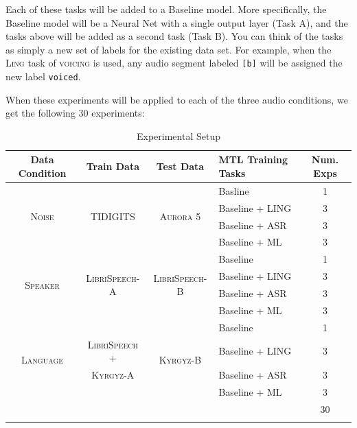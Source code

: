 \documentclass[10pt,a4paper]{article}
\begin{document}
Each of these tasks will be added to a Baseline model. More specifically, the Baseline model will be a Neural Net with a single output layer (Task A), and the tasks above will be added as a second task (Task B). You can think of the tasks as simply a new set of labels for the existing data set. For example, when the \textsc{Ling} task of \textsc{voicing} is used, any audio segment labeled \texttt{[b]} will be assigned the new label \texttt{voiced}.

When these experiments will be applied to each of the three audio conditions, we get the following 30 experiments:

\begin{table}[!htbp]
  \centering
  \begin{adjustbox}{width=.75\textwidth}
    \begin{tabular}{ccclc}
      \toprule
      \textbf{Data Condition} & \textbf{Train Data} & \textbf{Test Data} & \textbf{MTL Training Tasks} & \textbf{Num. Exps} \\
      \midrule
      \multirow{4}{*}{\textsc{Noise}} & \multirow{4}{*}{\textsc{TIDIGITS}} & \multirow{4}{*}{\textsc{Aurora 5}} & Basline & 1\\
      & & & Baseline + LING & 3   \\
      & & & Baseline + ASR  & 3  \\
      & & & Baseline + ML   & 3  \\
      \midrule
      \multirow{4}{*}{\textsc{Speaker}} & \multirow{4}{*}{\textsc{LibriSpeech-A}} & \multirow{4}{*}{\textsc{LibriSpeech-B}} & Baseline & 1 \\
      & & & Baseline + LING & 3  \\
      & & & Baseline + ASR  & 3  \\
      & & & Baseline + ML   & 3  \\     \midrule
      \multirow{4}{*}{\textsc{Language}} & & \multirow{4}{*}{\textsc{Kyrgyz-B}} & Baseline & 1\\
      & \textsc{LibriSpeech +} & & Baseline + LING  & 3 \\
      &  \textsc{Kyrgyz-A} & & Baseline + ASR   & 3 \\
      & & & Baseline + ML & 3 \\
      \midrule
      &&&& 30\\
      \bottomrule\\
    \end{tabular}
    \label{table:data}
  \end{adjustbox}
  
  \caption{Experimental Setup}
  
\end{table}
\end{document}
